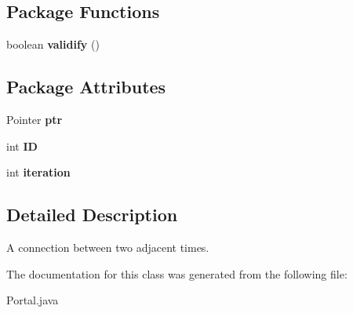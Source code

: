 \subsection*{Package Functions}
\begin{CompactItemize}
\item 
\hypertarget{classPortal_0de12fecec65b2e2d873bc5b612fa41b}{
boolean \textbf{validify} ()}
\label{classPortal_0de12fecec65b2e2d873bc5b612fa41b}

\end{CompactItemize}
\subsection*{Package Attributes}
\begin{CompactItemize}
\item 
\hypertarget{classPortal_085779842017d4b8c53021d29493df44}{
Pointer \textbf{ptr}}
\label{classPortal_085779842017d4b8c53021d29493df44}

\item 
\hypertarget{classPortal_afffd0cb7ff19b0abeb3dfb4919c1387}{
int \textbf{ID}}
\label{classPortal_afffd0cb7ff19b0abeb3dfb4919c1387}

\item 
\hypertarget{classPortal_8d5c901b3e23cd2775a7eef6a6babc29}{
int \textbf{iteration}}
\label{classPortal_8d5c901b3e23cd2775a7eef6a6babc29}

\end{CompactItemize}


\subsection{Detailed Description}
A connection between two adjacent times. 

The documentation for this class was generated from the following file:\begin{CompactItemize}
\item 
Portal.java\end{CompactItemize}
